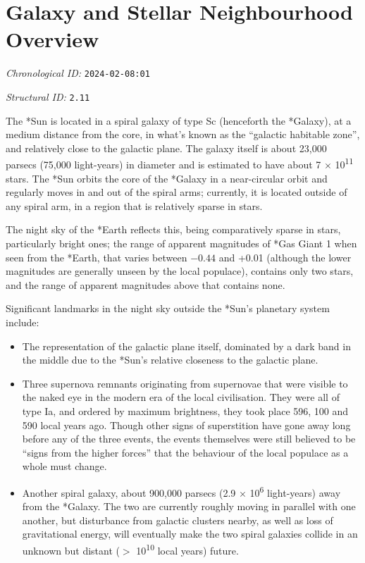 \section{Galaxy and Stellar Neighbourhood Overview}
\emph{Chronological ID:} \texttt{2024-02-08:01}

\emph{Structural ID:} \texttt{2.11}

The *Sun is located in a spiral galaxy of type Sc (henceforth the *Galaxy), at a medium distance from the core, in what's known as the ``galactic habitable zone'', and relatively close to the galactic plane. The galaxy itself is about 23,000 parsecs (75,000 light-years) in diameter and is estimated to have about 7 $\times$ 10\textsuperscript{11} stars. The *Sun orbits the core of the *Galaxy in a near-circular orbit and regularly moves in and out of the spiral arms; currently, it is located outside of any spiral arm, in a region that is relatively sparse in stars.

The night sky of the *Earth reflects this, being comparatively sparse in stars, particularly bright ones; the range of apparent magnitudes of *Gas Giant 1 when seen from the *Earth, that varies between $-0.44$ and +0.01 (although the lower magnitudes are generally unseen by the local populace), contains only two stars, and the range of apparent magnitudes above that contains none.

Significant landmarks in the night sky outside the *Sun's planetary system include:

\begin{itemize}
  \item The representation of the galactic plane itself, dominated by a dark band in the middle due to the *Sun's relative closeness to the galactic plane.
  \item Three supernova remnants originating from supernovae that were visible to the naked eye in the modern era of the local civilisation. They were all of type Ia, and ordered by maximum brightness, they took place 596, 100 and 590 local years ago. Though other signs of superstition have gone away long before any of the three events, the events themselves were still believed to be ``signs from the higher forces'' that the behaviour of the local populace as a whole must change.
  \item Another spiral galaxy, about 900,000 parsecs (2.9 $\times$ 10\textsuperscript{6} light-years) away from the *Galaxy. The two are currently roughly moving in parallel with one another, but disturbance from galactic clusters nearby, as well as loss of gravitational energy, will eventually make the two spiral galaxies collide in an unknown but distant ($>$ 10\textsuperscript{10} local years) future.
\end{itemize}
\newpage
